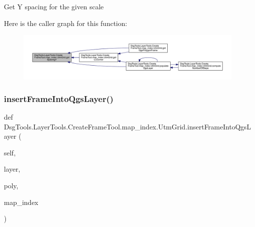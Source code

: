 \begin{DoxyVerb}Get Y spacing for the given scale
\end{DoxyVerb}
 Here is the caller graph for this function\+:
\nopagebreak
\begin{figure}[H]
\begin{center}
\leavevmode
\includegraphics[width=350pt]{class_dsg_tools_1_1_layer_tools_1_1_create_frame_tool_1_1map__index_1_1_utm_grid_ab251ae61488ef7308d8efd2ea02010e8_icgraph}
\end{center}
\end{figure}
\mbox{\label{class_dsg_tools_1_1_layer_tools_1_1_create_frame_tool_1_1map__index_1_1_utm_grid_a7384e3bce25108782525f098a7fe8df9}} 
\subsubsection{\texorpdfstring{insert\+Frame\+Into\+Qgs\+Layer()}{insertFrameIntoQgsLayer()}}
{\footnotesize\ttfamily def Dsg\+Tools.\+Layer\+Tools.\+Create\+Frame\+Tool.\+map\+\_\+index.\+Utm\+Grid.\+insert\+Frame\+Into\+Qgs\+Layer (\begin{DoxyParamCaption}\item[{}]{self,  }\item[{}]{layer,  }\item[{}]{poly,  }\item[{}]{map\+\_\+index }\end{DoxyParamCaption})}

